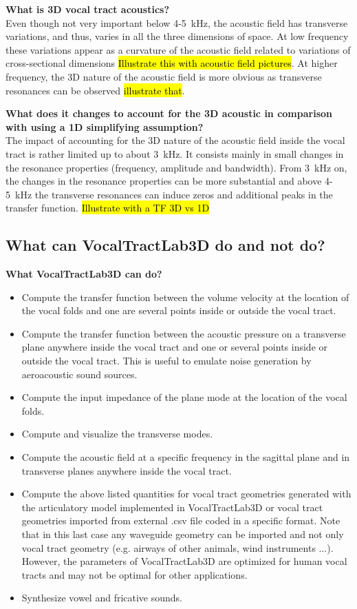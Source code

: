 \documentclass[]{article}
\begin{document}
	\textbf{What is 3D vocal tract acoustics?}\\
	Even though not very important below 4-5~kHz, 
	the acoustic field has transverse variations, and thus, varies in
	all the three dimensions of space. At low frequency these variations
	appear as a curvature of the acoustic field related to variations
	of cross-sectional dimensions \hl{Illustrate this with acoustic field pictures}. At higher frequency, the 3D nature of the acoustic field is more obvious as transverse resonances can be observed
	\hl{illustrate that}.
	
	\textbf{What does it changes to account for the 3D acoustic in comparison with using a 1D simplifying assumption?}\\
	The impact of accounting for the 3D nature of the acoustic field 
	inside the vocal tract is rather limited up to about 3~kHz. 
	It consists mainly in small changes in the resonance properties
	(frequency, amplitude and bandwidth). From 3~kHz on, the changes 
	in the resonance properties can be more substantial and above 
	4-5~kHz the transverse resonances can induce zeros and additional 
	peaks in the transfer function. \hl{Illustrate with a TF 3D vs 1D}
	
	\subsection{What can VocalTractLab3D do and not do?}
	
	\textbf{What VocalTractLab3D can do?}
	\begin{itemize}
		\item Compute the transfer function between the volume velocity
		at the location of the vocal folds and one are several points inside or outside the vocal tract.
		\item Compute the transfer function between the acoustic pressure on a transverse plane anywhere inside the vocal tract and one or several points inside or outside the vocal tract.
		This is useful to emulate noise generation by aeroacoustic 
		sound sources.
		\item Compute the input impedance of the plane mode at the 
		location of the vocal folds.
		\item Compute and visualize the transverse modes.
		\item Compute the acoustic field at a specific frequency in the sagittal plane and in transverse planes anywhere inside the vocal tract.
		\item Compute the above listed quantities for vocal tract 
		geometries generated with the articulatory model implemented 
		in VocalTractLab3D or vocal tract geometries imported from 
		external .csv file coded in a specific format. Note that in 
		this last case any waveguide geometry can be imported and not only vocal tract geometry (e.g. airways of other animals, wind instruments ...). However, the parameters of VocalTractLab3D 
		are optimized for human vocal tracts and may not be optimal for
		other applications.
		\item Synthesize vowel and fricative sounds.
	\end{itemize}
\end{document}
